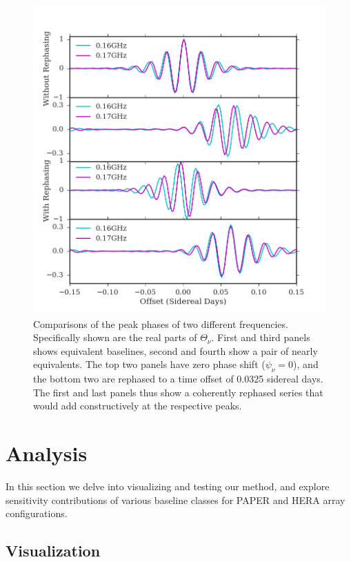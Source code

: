 \documentclass[twocolumn,apj,numberedappendix]{emulateapj}
\renewcommand\[{\begin{equation}}
\renewcommand\]{\end{equation}}
\begin{document}
\begin{figure}[H]
\includegraphics[width=1.1\linewidth]{rephs}

\caption{Comparisons of the peak phases of two different frequencies. Specifically shown are the real parts of $\Theta_{\nu}$. First and third panels shows equivalent baselines, second and fourth show a pair of nearly equivalents. The top two panels have zero phase shift ($\psi_{\nu}=0$), and the bottom two are rephased to a time offset of 0.0325 sidereal days. The first and last panels thus show a coherently rephased series that would add constructively at the respective peaks. }
\label{fig:freqdiff}
\end{figure}

\section{Analysis}

In this section we delve into visualizing and testing our method, and explore sensitivity contributions of various baseline classes for PAPER and HERA array configurations. 
\subsection{Visualization \label{sec:visual}}
\end{document}
